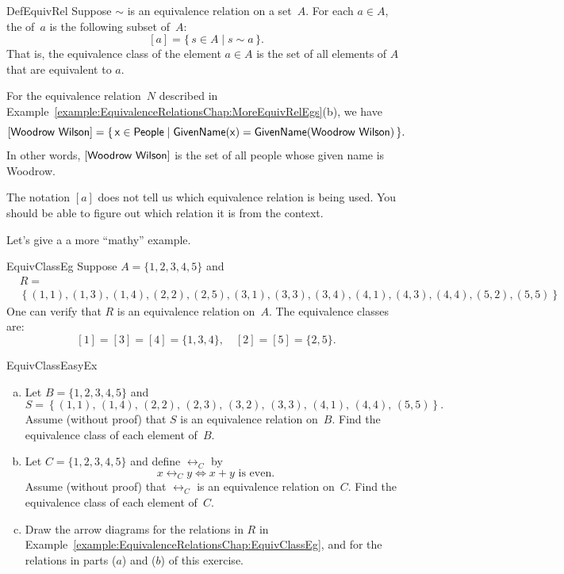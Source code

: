  \begin{defn}{DefEquivRel}
 Suppose $\sim$ is an equivalence relation on a set~$A$. For each $a \in A$, the  of~$a$ is the following subset of~$A$:
 	$$ [a] = \{\, s \in A \mid s \sim a \,\} .$$
That is, the equivalence class of the element $a \in A$ is the set of all elements of $A$ that are equivalent to $a$.
\end{defn}


\begin{example}{}
For the equivalence relation~$N$ described in Example~\ref{example:EquivalenceRelationsChap:MoreEquivRelEgs}(b), we have
	$$ [\sf{Woodrow\,\,Wilson}] = \{\, x \in \sf{People} \mid \sf{GivenName}(x) = \sf{GivenName}(\sf{Woodrow\,\,Wilson}) \,\} .$$
In other words, $[\sf{Woodrow\,\,Wilson}]$ is the set of all people whose given name is Woodrow.
\end{example}

\begin{warn}
The notation $[a]$ does not tell us which equivalence relation is being used. You should be able to figure out which relation it is from the context.
\end{warn}

Let's give a a more ``mathy'' example.

\begin{example}{EquivClassEg}
Suppose $A = \{1,2,3,4,5\}$ and 
\begin{align*}
&R = \\
&\left\{  (1,1), (1,3), (1,4), (2,2), (2,5), (3,1), (3,3), 
		(3,4), (4,1), (4,3), (4,4), (5,2), (5,5) 
\right\}
\end{align*}
One can verify that $R$ is an equivalence relation on~$A$. The equivalence classes are:
$$ [1] = [3] = [4] = \{1,3,4\},
\quad [2] = [5] = \{2,5\}.$$
\end{example}

\begin{exercise}{EquivClassEasyEx}
\begin{enumerate}[(a)]
\item \label{EquivClassEasyEx-set}
Let $B = \{1,2,3,4,5\}$ and 
	$$S = \left\{ (1,1),\, (1,4),\, (2,2),\, (2,3),\, (3,2),\, 
		(3,3),\, (4,1),\, (4,4),\, (5,5)
		 \right\} .$$
Assume (without proof) that $S$ is an equivalence relation on~$B$. Find the equivalence class of each element of~$B$.


\item \label{EquivClassEasyEx-x+y}
Let $C = \{1,2,3,4,5\}$ and define $\rel_C$ by 
\[ x \rel_C y \iff x + y \text{ is even.} \]
Assume (without proof) that $\rel_C$ is an equivalence relation on~$C$. Find the equivalence class of each element of~$C$.
\item
Draw the arrow diagrams for the relations in $R$ in Example~\ref{example:EquivalenceRelationsChap:EquivClassEg}, and for the relations in parts ($a$) and ($b$) of this exercise.
\end{enumerate}
\end{exercise}


